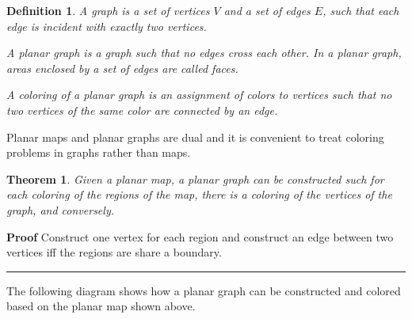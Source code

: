 \documentclass[11pt,a4paper]{article}
\newtheorem{theorem}{Theorem}
\newtheorem{definition}{Definition}
\newcommand*{\qed}{\hfill\rule{1ex}{1.5ex}}
\begin{document}
\begin{center}
\end{center}

\begin{definition}
A \emph{graph} is a set of \emph{vertices} $V$ and a set of \emph{edges} $E$, such that each edge is incident with exactly two vertices.

A \emph{planar graph} is a graph such that no edges cross each other. In a planar graph, areas enclosed by a set of edges are called \emph{faces}.

A \emph{coloring} of a planar graph is an assignment of colors to vertices such that no two vertices of the same color are connected by an edge.
\end{definition}

Planar maps and planar graphs are dual and it is convenient to treat coloring problems in graphs rather than maps.

\begin{theorem}
Given a planar map, a planar graph can be constructed such for each coloring of the regions of the map, there is a coloring of the vertices of the graph, and conversely.
\end{theorem}

\textbf{Proof}
Construct one vertex for each region and construct an edge between two vertices iff the regions are share a boundary.\qed

The following diagram shows how a planar graph can be constructed and colored based on the planar map shown above.
\end{document}
